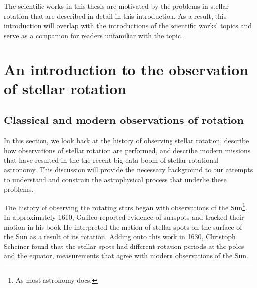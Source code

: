 The scientific works in this thesis are motivated by the problems in stellar rotation that are described in detail in this introduction. As a result, this introduction will overlap with the introductions of the scientific works' topics and serve as a companion for readers unfamiliar with the topic.

\section{An introduction to the observation of stellar rotation}
\label{sec:history}

\subsection{Classical and modern observations of rotation}

In this section, we look back at the history of observing stellar rotation, describe how observations of stellar rotation are performed, and describe modern missions that have resulted in the the recent big-data boom of stellar rotational astronomy.
This discussion will provide the necessary background to our attempts to understand and constrain the astrophysical process that underlie these problems.

The history of observing the rotating stars began with observations of the Sun\footnote{As most astronomy does.}. 
In approximately 1610, Galileo reported evidence of sunspots and tracked their motion in his book  
He interpreted the motion of stellar spots on the surface of the Sun as a result of its rotation. 
Adding onto this work in 1630, Christoph Scheiner found that the stellar spots had different rotation periods at the poles and the equator, measurements that agree with modern observations of the Sun. 

